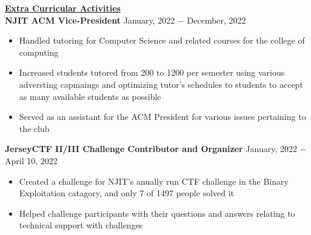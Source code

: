 \documentclass{article}
\begin{document}
\noindent \textbf{\underline{Extra Curricular Activities}} \\
\noindent \textbf{NJIT ACM Vice-President} \hfill January, 2022 $-$ December, 2022
\begin{itemize}[noitemsep,nolistsep,leftmargin=*]
\item {Handled tutoring for Computer Science and related courses for the college of computing}
\item {Increased students tutored from 200 to 1200 per semester using various adversting capmaings and optimizing tutor's schedules to students to accept as many available students as possible}
\item {Served as an assistant for the ACM President for various issues pertaining to the club}
\end{itemize}
\noindent \textbf{JerseyCTF II/III Challenge Contributor and Organizer} \hfill January, 2022 $-$ April 10, 2022
\begin{itemize}[noitemsep,nolistsep,leftmargin=*]
\item {Created a challenge for NJIT's anually run CTF challenge in the Binary Exploitation catagory, and only 7 of 1497 people solved it}
\item {Helped challenge participants with their questions and answers relating to technical support with challenges}
\end{itemize}

\end{document}
